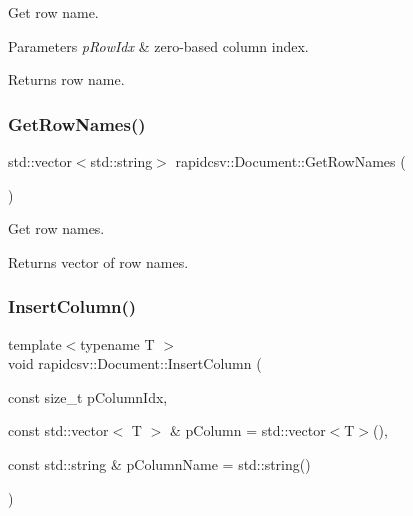 Get row name. 


\begin{DoxyParams}{Parameters}
{\em p\+Row\+Idx} & zero-\/based column index. \\
\hline
\end{DoxyParams}
\begin{DoxyReturn}{Returns}
row name. 
\end{DoxyReturn}
\mbox{\label{classrapidcsv_1_1Document_a0056283ff602ee5936dabae43e51b0ba}} 
\subsubsection{\texorpdfstring{Get\+Row\+Names()}{GetRowNames()}}
{\footnotesize\ttfamily std\+::vector$<$std\+::string$>$ rapidcsv\+::\+Document\+::\+Get\+Row\+Names (\begin{DoxyParamCaption}{ }\end{DoxyParamCaption})\hspace{0.3cm}{\ttfamily [inline]}}



Get row names. 

\begin{DoxyReturn}{Returns}
vector of row names. 
\end{DoxyReturn}
\mbox{\label{classrapidcsv_1_1Document_a774353ea9ad58c3a8c63f8ff8aa44f69}} 
\subsubsection{\texorpdfstring{Insert\+Column()}{InsertColumn()}}
{\footnotesize\ttfamily template$<$typename T $>$ \\
void rapidcsv\+::\+Document\+::\+Insert\+Column (\begin{DoxyParamCaption}\item[{const size\+\_\+t}]{p\+Column\+Idx,  }\item[{const std\+::vector$<$ T $>$ \&}]{p\+Column = {\ttfamily std\+:\+:vector$<$T$>$()},  }\item[{const std\+::string \&}]{p\+Column\+Name = {\ttfamily std\+:\+:string()} }\end{DoxyParamCaption})\hspace{0.3cm}{\ttfamily [inline]}}




